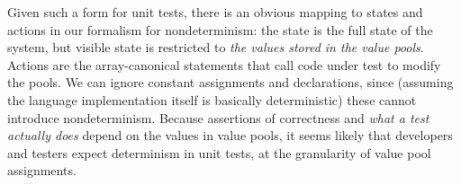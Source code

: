 Given such a form for unit tests, there is an obvious mapping to
states and actions in our formalism for nondeterminism:  the state is
the full state of the system, but visible state is restricted to
\emph{the values stored in the value pools}.  Actions are the
array-canonical statements that call code under test to modify the pools.  We can ignore constant assignments and
declarations, since (assuming the language implementation itself is
basically deterministic) these cannot introduce nondeterminism.
Because assertions of correctness and \emph{what a test actually does}
depend on the values in value pools, it seems likely that developers
and testers expect determinism in unit tests, at the granularity of
value pool assignments.


